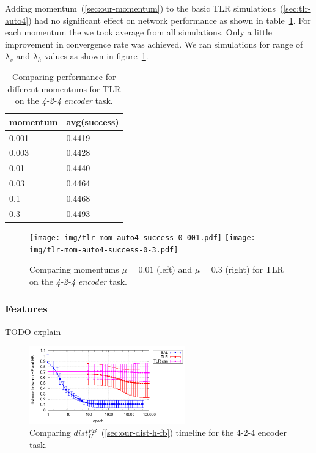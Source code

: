 Adding momentum~(\ref{sec:our-momentum}) to the basic TLR simulations~(\ref{sec:tlr-auto4}) had no significant effect on network performance as shown in table~\ref{tab:results-mom-auto4}. For each momentum the we took average from all simulations. Only a little improvement in convergence rate was achieved. We ran simulations for range of $\lambda_v$ and $\lambda_h$ values as shown in figure~\ref{fig:results-tlr-auto4-momentum}. 
\begin{table}[H] 
  \centering
  {\small
    \begin{tabular}{|l|l|}
    \hline
momentum & avg(success) \\
    \hline
0.001  & 0.4419 \\
    \hline
0.003  & 0.4428 \\
    \hline
0.01   & 0.4440 \\
    \hline
0.03   & 0.4464 \\
    \hline
0.1    & 0.4468 \\
    \hline
0.3    & 0.4493 \\
    \hline
    \end{tabular}
  }
  \caption{Comparing performance for different momentums for TLR on the \emph{4-2-4 encoder} task.} 
  \label{tab:results-mom-auto4}
\end{table}


\begin{figure}[H]
  \centering
  \texttt{[image: img/tlr-mom-auto4-success-0-001.pdf]}  
  \texttt{[image: img/tlr-mom-auto4-success-0-3.pdf]}  
   \caption{Comparing momentums $\mu=0.01$ (left) and $\mu=0.3$ (right) for TLR on the \emph{4-2-4 encoder} task.}
  \label{fig:results-tlr-auto4-momentum}
\end{figure}


\subsubsection{Features}
TODO explain 

\begin{figure}[H]
  \centering
  \includegraphics[width=0.6\textwidth]{img/feature-cmp-h-fb-d.pdf}  
   \caption{Comparing $dist_{H}^{FB}$~(\ref{sec:our-dist-h-fb}) timeline for the {4-2-4 encoder} task.}
  \label{fig:results-candidates-h-fb-d}
\end{figure}

